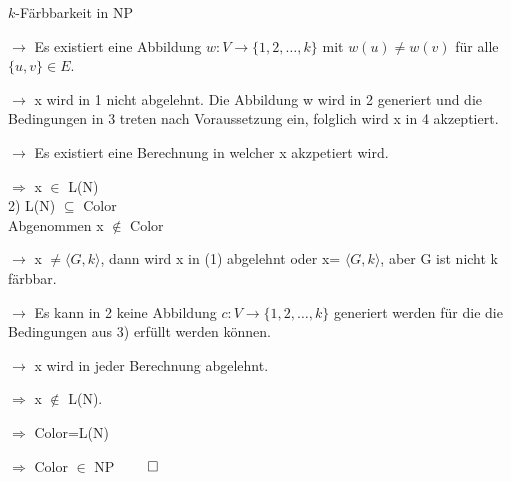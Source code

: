 \documentclass[answers]{submit}
\begin{document}
\begin{exercise}[6]{$k$-Färbbarkeit in NP}
{    $\rightarrow$ Es existiert eine Abbildung $w: V \rightarrow \{ 1,2,\dots,k\}$ mit $w(u)\neq w(v)$ für alle $\{u,v\}\in E$.

    $\rightarrow$ x wird in 1 nicht abgelehnt. Die Abbildung w wird in 2 generiert und die Bedingungen in 3 treten nach Voraussetzung ein, folglich wird x in 4 akzeptiert.

    $\rightarrow$ Es existiert eine Berechnung in welcher x akzpetiert wird.

    $\Rightarrow$ x $\in$ L(N) \\

    2)  L(N) $\subseteq$ Color \\

    Abgenommen x $\notin$ Color

    $\rightarrow$ x $ \neq \langle G,k \rangle $, dann wird x in (1) abgelehnt oder x= $\langle G,k \rangle $, aber G ist nicht k färbbar.

    $\rightarrow$ Es kann in 2 keine Abbildung $c: V \rightarrow \{ 1,2,\dots,k\}$ generiert werden für die die Bedingungen aus 3) erfüllt werden können.

    $\rightarrow$ x wird in jeder Berechnung abgelehnt.

    $\Rightarrow$ x $\notin$ L(N).

    $\Rightarrow$ Color=L(N)

    $\Rightarrow$ Color $\in$ NP $\qed$
  }
\end{exercise}
\end{document}
